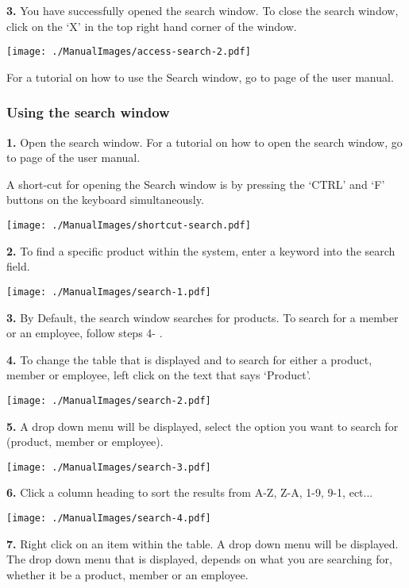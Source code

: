 \pagebreak

\textbf{3.} You have successfully opened the search window. To close the search window, click on the `X' in the top right hand corner of the window.

\texttt{[image: ./ManualImages/access-search-2.pdf]}

For a tutorial on how to use the Search window, go to page \pageref{fig:Using the search window} of the user manual.


\pagebreak
\subsubsection{Using the search window}
\label{fig:Using the search window}

\textbf{1.} Open the search window. For a tutorial on how to open the search window, go to page \pageref{fig:Accessing the search window} of the user manual.

A short-cut for opening the Search window is by pressing the `CTRL' and `F' buttons on the keyboard simultaneously.

\texttt{[image: ./ManualImages/shortcut-search.pdf]}

\textbf{2.} To find a specific product within the system, enter a keyword into the search field.

\texttt{[image: ./ManualImages/search-1.pdf]}

\textbf{3.} By Default, the search window searches for products. To search for a member or an employee, follow steps 4- .

\textbf{4.} To change the table that is displayed and to search for either a product, member or employee, left click on the text that says `Product'.

\texttt{[image: ./ManualImages/search-2.pdf]}

\textbf{5.} A drop down menu will be displayed, select the option you want to search for (product, member or employee).

\texttt{[image: ./ManualImages/search-3.pdf]}

\textbf{6.} Click a column heading to sort the results from A-Z, Z-A, 1-9, 9-1, ect...

\texttt{[image: ./ManualImages/search-4.pdf]}

\textbf{7.} Right click on an item within the table. A drop down menu will be displayed. The drop down menu that is displayed, depends on what you are searching for, whether it be a product, member or an employee.

